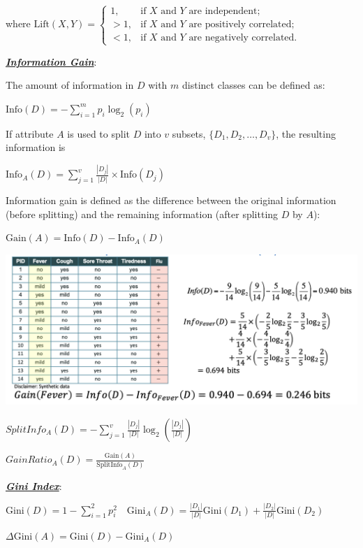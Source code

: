 \documentclass[12pt]{article}
\newcommand{\bulletPoint}[1]{\ul{\textit{\textbf{#1}}}}
\begin{document}
\begin{multicols*}{2}
where
$\text{Lift}(X, Y) =
\begin{cases} 
1, & \text{if } X \text{ and } Y \text{ are independent;} \\
>1, & \text{if } X \text{ and } Y \text{ are positively correlated;} \\
<1, & \text{if } X \text{ and } Y \text{ are negatively correlated.}
\end{cases}$

\bulletPoint{Information Gain}:

The amount of information in \( D \) with \( m \) distinct classes can be defined as:

$\text{Info}(D) = - \sum_{i=1}^{m} p_i \log_2(p_i)$

If attribute \(A\) is used to split \(D\) into \(v\) subsets, \(\{D_1, D_2, \ldots, D_v\}\), the resulting information is

$\text{Info}_A(D) = \sum_{j=1}^{v} \frac{|D_j|}{|D|} \times \text{Info}(D_j)$

Information gain is defined as the difference between the original information (before splitting) and the remaining information (after splitting \(D\) by \(A\)):

$\text{Gain}(A) = \text{Info}(D) - \text{Info}_A(D)$

\includegraphics[scale=0.36]{images/Information_Gain.png}

\quad

$SplitInfo_A(D) = -\sum_{j=1}^{v} \frac{|D_j|}{|D|} \log_2\left(\frac{|D_j|}{|D|}\right)$

$GainRatio_A(D) = \frac{\text{Gain}(A)}{\text{SplitInfo}_A(D)}$

\bulletPoint{Gini Index}:

$\text{Gini}(D) = 1 - \sum_{i=1}^{2} p_i^2 \quad \text{Gini}_A(D) = \frac{|D_1|}{|D|} \text{Gini}(D_1) + \frac{|D_2|}{|D|} \text{Gini}(D_2)$

$\Delta \text{Gini}(A) = \text{Gini}(D) - \text{Gini}_A(D)$


\end{multicols*}
\end{document}
